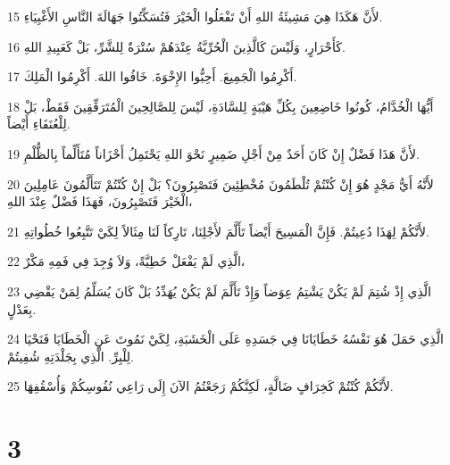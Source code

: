 \par 15 لأَنَّ هَكَذَا هِيَ مَشِيئَةُ اللهِ أَنْ تَفْعَلُوا الْخَيْرَ فَتُسَكِّتُوا جَهَالَةَ النَّاسِ الأَغْبِيَاءِ.
\par 16 كَأَحْرَارٍ، وَلَيْسَ كَالَّذِينَ الْحُرِّيَّةُ عِنْدَهُمْ سُتْرَةٌ لِلشَّرِّ، بَلْ كَعَبِيدِ اللهِ.
\par 17 أَكْرِمُوا الْجَمِيعَ. أَحِبُّوا الإِخْوَةَ. خَافُوا اللهَ. أَكْرِمُوا الْمَلِكَ.
\par 18 أَيُّهَا الْخُدَّامُ، كُونُوا خَاضِعِينَ بِكُلِّ هَيْبَةٍ لِلسَّادَةِ، لَيْسَ لِلصَّالِحِينَ الْمُتَرَفِّقِينَ فَقَطْ، بَلْ لِلْعُنَفَاءِ أَيْضاً.
\par 19 لأَنَّ هَذَا فَضْلٌ إِنْ كَانَ أَحَدٌ مِنْ أَجْلِ ضَمِيرٍ نَحْوَ اللهِ يَحْتَمِلُ أَحْزَاناً مُتَأَلِّماً بِالظُّلْمِ.
\par 20 لأَنَّهُ أَيُّ مَجْدٍ هُوَ إِنْ كُنْتُمْ تُلْطَمُونَ مُخْطِئِينَ فَتَصْبِرُونَ؟ بَلْ إِنْ كُنْتُمْ تَتَأَلَّمُونَ عَامِلِينَ الْخَيْرَ فَتَصْبِرُونَ، فَهَذَا فَضْلٌ عِنْدَ اللهِ،
\par 21 لأَنَّكُمْ لِهَذَا دُعِيتُمْ. فَإِنَّ الْمَسِيحَ أَيْضاً تَأَلَّمَ لأَجْلِنَا، تَارِكاً لَنَا مِثَالاً لِكَيْ تَتَّبِعُوا خُطُواتِهِ.
\par 22 الَّذِي لَمْ يَفْعَلْ خَطِيَّةً، وَلاَ وُجِدَ فِي فَمِهِ مَكْرٌ،
\par 23 الَّذِي إِذْ شُتِمَ لَمْ يَكُنْ يَشْتِمُ عِوَضاً وَإِذْ تَأَلَّمَ لَمْ يَكُنْ يُهَدِّدُ بَلْ كَانَ يُسَلِّمُ لِمَنْ يَقْضِي بِعَدْلٍ.
\par 24 الَّذِي حَمَلَ هُوَ نَفْسُهُ خَطَايَانَا فِي جَسَدِهِ عَلَى الْخَشَبَةِ، لِكَيْ نَمُوتَ عَنِ الْخَطَايَا فَنَحْيَا لِلْبِرِّ. الَّذِي بِجَلْدَتِهِ شُفِيتُمْ.
\par 25 لأَنَّكُمْ كُنْتُمْ كَخِرَافٍ ضَالَّةٍ، لَكِنَّكُمْ رَجَعْتُمُ الآنَ إِلَى رَاعِي نُفُوسِكُمْ وَأُسْقُفِهَا.

\chapter{3}

